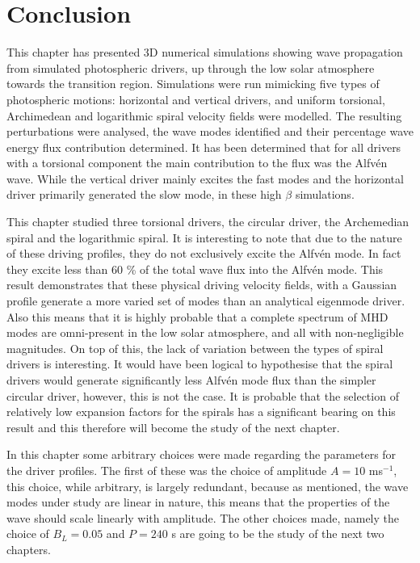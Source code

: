 \section{Conclusion}
This chapter has presented 3D numerical simulations showing wave propagation from simulated photospheric drivers, up through the low solar atmosphere towards the transition region.
Simulations were run mimicking five types of photospheric motions: horizontal and vertical drivers, and uniform torsional, Archimedean and logarithmic spiral velocity fields were modelled.
The resulting perturbations were analysed, the wave modes identified and their percentage wave energy flux contribution determined. 
It has been determined that for all drivers with a torsional component the main contribution to the flux was the Alfv\'en wave.
While the vertical driver mainly excites the fast modes and the horizontal driver primarily generated the slow mode, in these high $\beta$ simulations.

This chapter studied three torsional drivers, the circular driver, the Archemedian spiral and the logarithmic spiral.
It is interesting to note that due to the nature of these driving profiles, they do not exclusively excite the Alfv\'en mode.
In fact they excite less than $60$ \% of the total wave flux into the Alfv\'en mode.
This result demonstrates that these physical driving velocity fields, with a Gaussian profile generate a more varied set of modes than an analytical eigenmode driver.
Also this means that it is highly probable that a complete spectrum of MHD modes are omni-present in the low solar atmosphere, and all with non-negligible magnitudes.
On top of this, the lack of variation between the types of spiral drivers is interesting.
It would have been logical to hypothesise that the spiral drivers would generate significantly less Alfv\'en mode flux than the simpler circular driver, however, this is not the case.
It is probable that the selection of relatively low expansion factors for the spirals has a significant bearing on this result and this therefore will become the study of the next chapter.

In this chapter some arbitrary choices were made regarding the parameters for the driver profiles.
The first of these was the choice of amplitude $A=10$ ms$^{-1}$, this choice, while arbitrary, is largely redundant, because as mentioned, the wave modes under study are linear in nature, this means that the properties of the wave should scale linearly with amplitude.
The other choices made, namely the choice of $B_L = 0.05$ and $P=240$ s are going to be the study of the next two chapters.



